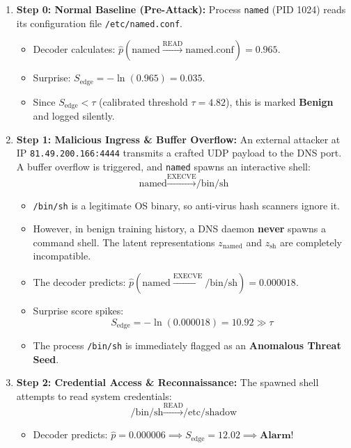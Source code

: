 \documentclass[11pt,a4paper]{report}
\begin{document}
\begin{enumerate}
    \item \textbf{Step 0: Normal Baseline (Pre-Attack):}
    Process \texttt{named} (PID 1024) reads its configuration file \texttt{/etc/named.conf}.
    \begin{itemize}
        \item Decoder calculates: $\hat{p}(\text{named} \xrightarrow{\text{READ}} \text{named.conf}) = 0.965$.
        \item Surprise: $S_{\text{edge}} = -\ln(0.965) = 0.035$.
        \item Since $S_{\text{edge}} < \tau$ (calibrated threshold $\tau = 4.82$), this is marked \textbf{Benign} and logged silently.
    \end{itemize}

    \item \textbf{Step 1: Malicious Ingress \& Buffer Overflow:}
    An external attacker at IP \texttt{81.49.200.166:4444} transmits a crafted UDP payload to the DNS port. A buffer overflow is triggered, and \texttt{named} spawns an interactive shell:
    $$\text{named} \xrightarrow{\text{EXECVE}} \text{/bin/sh}$$
    \begin{itemize}
        \item \texttt{/bin/sh} is a legitimate OS binary, so anti-virus hash scanners ignore it.
        \item However, in benign training history, a DNS daemon \textbf{never} spawns a command shell. The latent representations $z_{\text{named}}$ and $z_{\text{sh}}$ are completely incompatible.
        \item The decoder predicts: $\hat{p}(\text{named} \xrightarrow{\text{EXECVE}} \text{/bin/sh}) = 0.000018$.
        \item Surprise score spikes:
        $$S_{\text{edge}} = -\ln(0.000018) = \mathbf{10.92} \gg \tau$$
        \item The process \texttt{/bin/sh} is immediately flagged as an \textbf{Anomalous Threat Seed}.
    \end{itemize}

    \item \textbf{Step 2: Credential Access \& Reconnaissance:}
    The spawned shell attempts to read system credentials:
    $$\text{/bin/sh} \xrightarrow{\text{READ}} \text{/etc/shadow}$$
    \begin{itemize}
        \item Decoder predicts: $\hat{p} = 0.000006 \implies S_{\text{edge}} = 12.02 \implies \mathbf{Alarm!}$
    \end{itemize}


\end{enumerate}
\end{document}
